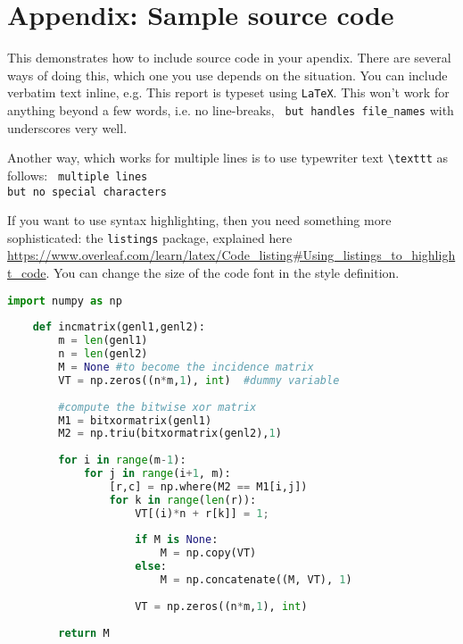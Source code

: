 \section{Appendix: Sample source code}\label{app:sample-source-code}

This demonstrates how to include source code in your apendix.  There are several ways of doing this, which one you use depends on the situation.  You can include verbatim text inline, e.g.  This report is typeset using  \verb|LaTeX|.  This won't work for anything beyond a few words, i.e. no line-breaks, \verb| but handles file_names| with underscores very well.

Another way, which works for multiple lines is to use typewriter text \verb|\texttt| as follows:
\texttt{
multiple lines \\
but no special characters }

If you want to use syntax highlighting, then you need something more sophisticated: the \verb|listings| package, explained here \url{https://www.overleaf.com/learn/latex/Code_listing#Using_listings_to_highlight_code}.  You can change the size of the code font in the style definition.


\begin{lstlisting}[language=python]
    import numpy as np
        
    def incmatrix(genl1,genl2):
        m = len(genl1)
        n = len(genl2)
        M = None #to become the incidence matrix
        VT = np.zeros((n*m,1), int)  #dummy variable
        
        #compute the bitwise xor matrix
        M1 = bitxormatrix(genl1)
        M2 = np.triu(bitxormatrix(genl2),1) 
    
        for i in range(m-1):
            for j in range(i+1, m):
                [r,c] = np.where(M2 == M1[i,j])
                for k in range(len(r)):
                    VT[(i)*n + r[k]] = 1;
                    
                    if M is None:
                        M = np.copy(VT)
                    else:
                        M = np.concatenate((M, VT), 1)
                    
                    VT = np.zeros((n*m,1), int)
        
        return M
\end{lstlisting}

  
